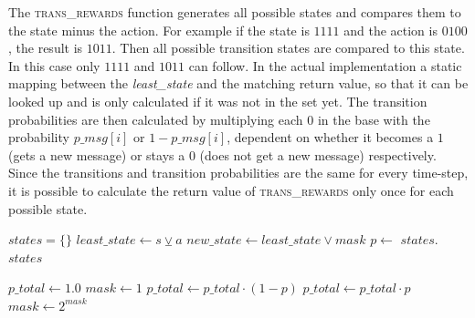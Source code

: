 \documentclass{article}
\begin{document}
		\clearpage
		\begin{multicols}{2}
		The \textsc{trans\_rewards} function generates all possible states and
		compares them to the state minus the action. For example if the state is
		$1111$ and the action is $0100$, the result is $1011$. Then all possible
		transition states are compared to this state. In this case only $1111$
		and $1011$ can follow. In the actual implementation a static mapping
		between the \textit{least\_state} and the matching return value, so that
		it can be looked up and is only calculated if it was not in the set yet.
		The transition probabilities are then calculated by multiplying each $0$
		in the base with the probability $\mathit{p\_msg[i]}$ or $1
		-\mathit{p\_msg[i]}$, dependent on whether it becomes a $1$ (gets a new
		message) or stays a $0$ (does not get a new message) respectively.
		Since the transitions and transition probabilities are the same for every
		time-step, it is possible to calculate the return value of
		\textsc{trans\_rewards} only once for each possible state.
		\end{multicols}

		\begin{algorithm}[h!]
			\begin{algorithmic}[1]
				\State $\mathit{states} = \{\}$
				\State $\mathit{least\_state} \gets s \veebar a$
				\State $\mathit{new\_state} \gets \mathit{least\_state} \vee \mathit{mask}$
				\State $p \gets $ 
				\State $\mathit{states}.$
				\EndFor
				\State \Return $\mathit{states}$
				\EndFunction
			\end{algorithmic}

			\begin{algorithmic}[1]
				\State $\mathit{p\_total} \gets 1.0$
				\State $\mathit{mask} \gets 1$
				\State $\mathit{p\_total} \gets \mathit{p\_total} \cdot (1-p)$
				\Else
				\State $\mathit{p\_total} \gets \mathit{p\_total} \cdot p$
				\EndIf
				\EndIf
				\State $\mathit{mask} \gets 2^{\mathit{mask}}$ 
				\EndFor
				\State {}
				\EndFunction
			\end{algorithmic}
			\label{alg:trans_rewards}
		\end{algorithm}
	\clearpage
\end{document}
